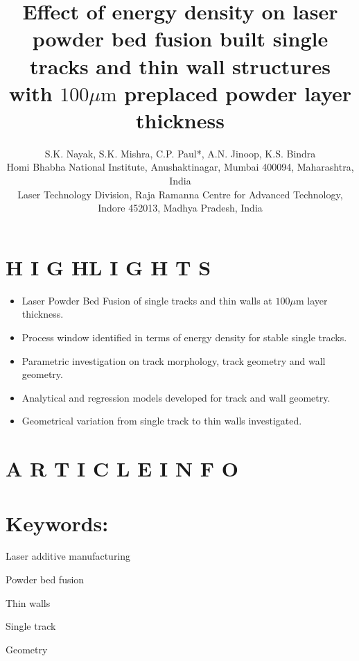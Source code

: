 \documentclass[10pt]{article}
\title{Effect of energy density on laser powder bed fusion built single tracks and thin wall structures with $100 \mu \mathrm{m}$ preplaced powder layer thickness }
\author{S.K. Nayak, S.K. Mishra, C.P. Paul*, A.N. Jinoop, K.S. Bindra\\
Homi Bhabha National Institute, Anushaktinagar, Mumbai 400094, Maharashtra, India\\
Laser Technology Division, Raja Ramanna Centre for Advanced Technology, Indore 452013, Madhya Pradesh, India}
\date{}
\begin{document}
\maketitle


\section*{H I G HL I G H T S}
\begin{itemize}
  \item Laser Powder Bed Fusion of single tracks and thin walls at $100 \mu \mathrm{m}$ layer thickness.
  \item Process window identified in terms of energy density for stable single tracks.
  \item Parametric investigation on track morphology, track geometry and wall geometry.
  \item Analytical and regression models developed for track and wall geometry.
  \item Geometrical variation from single track to thin walls investigated.
\end{itemize}

\section*{A R T I C L E I N F O}
\section*{Keywords:}
Laser additive manufacturing

Powder bed fusion

Thin walls

Single track

Geometry
\end{document}
